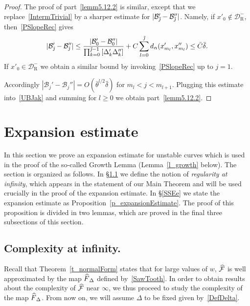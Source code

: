 \documentclass[AHL, Unicode, longabstracts,published]{cedram}
\newcommand{\nin}{\not\in}
\newcommand{\cB}{\mathcal{B}}
\newcommand{\pslope}{\mathcal{B}}
\newcommand{\cm}{\mathcal{F}}
\newcommand{\cell}{\mathcal{D}}
\newcommand{\cmp}{\hat\cm}
\newcommand{\brC}{\bar{C}}
\newcommand{\brdelta}{\bar{\delta}}
\newcommand{\recoPrivate}{\mathrm{R}}
\newcommand{\reco}{{\cell^-_{\recoPrivate}}}
\newcommand{\ppPrivate}[2]{#1^{#2}}
\newcommand{\prePrivate}[1]{\ppPrivate{#1}{-}}
\newcommand{\prpslope}{\prePrivate{\pslope}}
\newcommand{\nf}{\hat F}
\newcommand{\tj}{\tilde{\jmath}}
\renewcommand{\prpslope}{\cB}
\renewcommand{\prpslope}{\cB}
\renewcommand{\prpslope}{\cB}
\let\oldtilde\tilde
\renewcommand*{\tilde}[1]{\mathchoice{\widetilde{#1}}{\widetilde{#1}}{\oldtilde{#1}}{\oldtilde{#1}}}
\let\oldhat\hat
\renewcommand*{\hat}[1]{\mathchoice{\widehat{#1}}{\widehat{#1}}{\oldhat{#1}}{\oldhat{#1}}}
\begin{document}
\begin{proof}
The proof of part~\eqref{lemm5.12.2} is similar, except that we replace~\eqref{IntermTrivial} by a sharper estimate for $|\prpslope_{\tj}'-\prpslope_{\tj}''|$. Namely, if $x'_0\nin\reco$, then~\eqref{PSlopeRec} gives
\begin{equation*}
|\prpslope_{\tj}'-\prpslope_{\tj}''|
\leq \frac{\left|\cB_{0}'-\cB_{0}''\right|}{\prod_{k=0}^{\tj-1} \left[\Delta_k' \Delta_k''\right]} +C \sum_{l=0}^{\tj} d_\alpha (x_{m_l}', x_{m_l}'') \leq \brC\brdelta.
\end{equation*}
If $x'_0\in\reco$ we obtain a similar bound by invoking~\eqref{PSlopeRec} up to $j = 1$.

Accordingly $|\prpslope_{j}'-\prpslope_{j}''|=O(\bar\theta^{l/2}\brdelta)$ for $m_l < j < m_{l+1}$. Plugging this estimate into~\eqref{UBJak} and summing for $l\geq 0$ we obtain part~\eqref{lemm5.12.2}.
\end{proof}

\section{Expansion estimate}\label{sec:expansion-estimate}
In this section we prove an expansion estimate for unstable curves which is used in the proof of the so-called Growth Lemma (Lemma~\ref{l_growth} below). The section is organized as follows. In
\S\ref{SS-VirtualComplexity} we define the notion of
\emph{regularity at infinity}, which appears in the statement of our Main Theorem and will be used crucially in the proof of the expansion estimate. In \S\ref{SSEe} we state the expansion estimate as Proposition~\ref{p_expansionEstimate}. The proof of this proposition is divided in two lemmas, which are proved in the final three subsections of this section.

\subsection{Complexity at infinity.} \label{SS-VirtualComplexity}
Recall that Theorem~\ref{t_normalForm} states that for large values of $w$, $\cmp$ is well approximated by the map $\nf_\Delta$ defined by~\eqref{SawTooth}. In order to obtain results about the complexity of $\cmp$ near $\infty$, we thus proceed to study the complexity of the map $\nf_\Delta$. From now on, we will assume $\Delta$ to be fixed given by~\eqref{DefDelta}.
\end{document}
